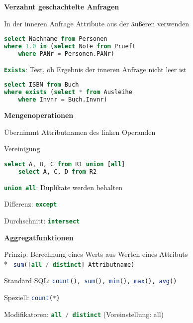 \textbf{Verzahnt geschachtelte Anfragen}
\begin{items}
	\item In der inneren Anfrage Attribute aus der äußeren verwenden
	\begin{lstlisting}[language=sql]
select Nachname from Personen
where 1.0 in (select Note from Prueft
	where PANr = Personen.PANr)
	\end{lstlisting}
	\item \lstinline[language=sql]{Exists}: Test, ob Ergebnis der inneren Anfrage nicht leer ist
	\begin{lstlisting}[language=sql]
select ISBN from Buch
where exists (select * from Ausleihe
	where Invnr = Buch.Invnr)
	\end{lstlisting}
\end{items}

\textbf{Mengenoperationen}
\begin{items}
	\item Übernimmt Attributnamen des linken Operanden
	\item Vereinigung
	\begin{lstlisting}[language=sql]
select A, B, C from R1 union [all]
	select A, C, D from R2
	\end{lstlisting}
	\item \lstinline[language=sql]{union all}: Duplikate werden behalten
	\item Differenz: \lstinline[language=sql]{except}
	\item Durchschnitt: \lstinline[language=sql]{intersect}
\end{items}

\textbf{Aggregatfunktionen}
\begin{items}
	\item Prinzip: Berechnung eines Werts aus Werten eines Attributs\\*
		\lstinline[language=sql]{ sum([all / distinct] Attributname) }
	\item Standard SQL: \lstinline[language=sql]{count(), sum(), min(), max(), avg()}
	\item Speziell: \lstinline[language=sql]{count(*)}
	\item Modifikatoren: \lstinline[language=sql]{all / distinct} (Voreinstellung: all)
\end{items}

